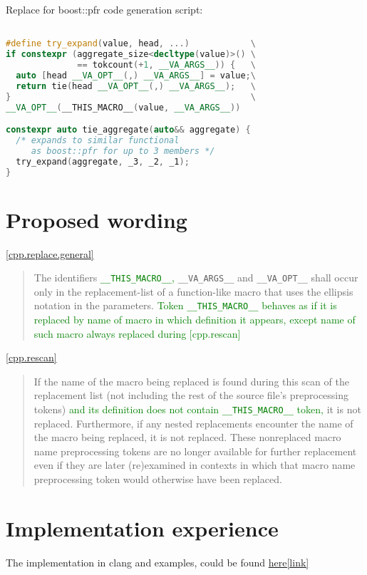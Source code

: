\documentclass[12pt]{article}
\begin{document}
Replace for boost::pfr code generation script:
\begin{lstlisting}[language=C++]

#define try_expand(value, head, ...)            \
if constexpr (aggregate_size<decltype(value)>() \
              == tokcount(+1, __VA_ARGS__)) {   \
  auto [head __VA_OPT__(,) __VA_ARGS__] = value;\
  return tie(head __VA_OPT__(,) __VA_ARGS__);   \
}                                               \
__VA_OPT__(__THIS_MACRO__(value, __VA_ARGS__))

constexpr auto tie_aggregate(auto&& aggregate) {
  /* expands to similar functional
     as boost::pfr for up to 3 members */
  try_expand(aggregate, _3, _2, _1);
}

\end{lstlisting}

\newpage

\section{Proposed wording}

\href{https://eel.is/c++draft/cpp#replace.general-6}{[cpp.replace.general]}

\begin{quote}
The identifiers \textcolor{green}{ \lstinline{__THIS_MACRO__},}
\lstinline{__VA_ARGS__} and \lstinline{__VA_OPT__}
shall occur only in the replacement-list
of a function-like macro that uses
the ellipsis notation in the parameters.
\textcolor{green}{Token \lstinline{__THIS_MACRO__}
behaves as if it is replaced by name of macro
in which definition it appears, except name
of such macro always replaced during [cpp.rescan]}
\end{quote}

\bigskip

\href{https://eel.is/c++draft/cpp#rescan-3}{[cpp.rescan]}

\begin{quote}
If the name of the macro being replaced is found during this scan of the replacement list (not including the rest of the source file's preprocessing tokens)
\textcolor{green}{and its definition does not contain \lstinline{__THIS_MACRO__} token, }
it is not replaced. Furthermore, if any nested replacements encounter the name of the macro being replaced, it is not replaced. These nonreplaced macro name preprocessing tokens are no longer available for further replacement even if they are later (re)examined in contexts in which that macro name preprocessing token would otherwise have been replaced.
\end{quote}

\section{Implementation experience}

The implementation in clang and examples,
could be found \href{https://github.com/llvm/llvm-project/pull/65851}{here[link]}
\end{document}
